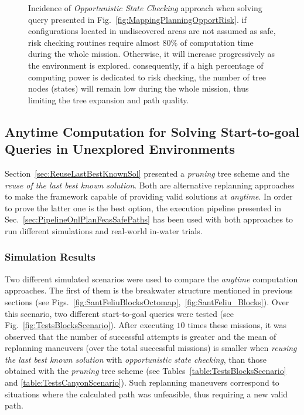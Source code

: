 \begin{figure}[htbp]
\myfloatalign
     \quad
\caption[Incidence of \textit{Opportunistic State Checking} approach when
solving a start-to-goal query.]
{Incidence of \textit{Opportunistic State Checking} approach when
solving query presented in Fig.~\ref{fig:MappingPlanningOpportRisk}.
\protect{} if configurations located in
undiscovered areas are not assumed as safe, risk checking routines require
almost $80\%$ of computation time during the whole mission. Otherwise, it will
increase progressively as the environment is explored.
\protect{} consequently, if a high
percentage of computing power is dedicated to risk checking, the number of tree
nodes (states) will remain low during the whole mission, thus limiting the tree
expansion and path quality.}
\label{fig:CompareOpportRiskCheck}
\end{figure}

\subsection{Anytime Computation for Solving Start-to-goal Queries in Unexplored
Environments}

Section~\ref{sec:ReuseLastBestKnownSol} presented a \textit{pruning} tree scheme
and the \textit{reuse of the last best known solution}. Both are alternative
replanning approaches to make the framework capable of providing valid solutions
at \textit{anytime}. In order to prove the latter one is the best option, the
execution pipeline presented in Sec.~\ref{sec:PipelineOnlPlanFeasSafePaths} has
been used with both approaches to run different simulations and real-world
in-water trials.

\subsubsection{Simulation Results} 

Two different simulated scenarios were used to compare the \textit{anytime}
computation approaches. The first of them is the breakwater structure mentioned
in previous sections (see
Figs.~\ref{fig:SantFeliuBlocksOctomap},~\ref{fig:SantFeliu_Blocks}). Over this
scenario, two different start-to-goal queries were tested (see
Fig.~\ref{fig:TestsBlocksScenario}). After executing $10$ times these missions,
it was observed that the number of successful attempts is greater and the mean
of replanning maneuvers (over the total successful missions) is smaller when
\textit{reusing the last best known solution} with \textit{opportunistic state
checking}, than those obtained with the \textit{pruning} tree scheme (see
Tables~\ref{table:TestsBlocksScenario} and \ref{table:TestsCanyonScenario}).
Such replanning maneuvers correspond to situations where the calculated path was
unfeasible, thus requiring a new valid path.

